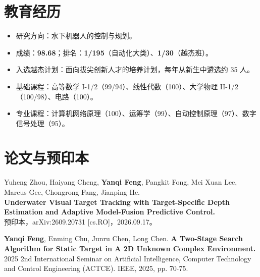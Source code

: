 \documentclass[10pt,a4paper]{article}
\begin{document}
\fontsize{10}{14}\selectfont
{}

\section{教育经历}
\begin{itemize}
  \item 研究方向：水下机器人的控制与规划。
\end{itemize}
\begin{itemize}
  \item 成绩：\textbf{98.68}；排名：\textbf{1/195}（自动化大类）、\textbf{1/30}（越杰班）。
  \item 入选越杰计划：面向拔尖创新人才的培养计划，每年从新生中遴选约 35 人。
  \item 基础课程：高等数学 I-1/2（99/94）、线性代数（100）、大学物理 II-1/2（100/98）、电路（100）。
  \item 专业课程：计算机网络原理（100）、运筹学（99）、自动控制原理（97）、数字信号处理（95）。
\end{itemize}

\section{论文与预印本}
\begin{enumerate}[label={[\arabic*]}]
  \item Yuheng Zhou, Haiyang Cheng, \textbf{Yanqi Feng}, Pangkit Fong, Mei Xuan Lee, Marcus Gee, Chongrong Fang, Jianping He.\\
  \textbf{Underwater Visual Target Tracking with Target-Specific Depth Estimation and Adaptive Model-Fusion Predictive Control.}\\
  预印本，arXiv:2609.20731 [cs.RO]，2026.09.17。
  \item \textbf{Yanqi Feng}, Enming Chu, Junru Chen, Long Chen. \textbf{A Two-Stage Search Algorithm for Static Target in A 2D Unknown Complex Environment.}\\
  2025 2nd International Seminar on Artificial Intelligence, Computer Technology and Control Engineering (ACTCE). IEEE, 2025, pp. 70-75. 
\end{enumerate}
\end{document}
